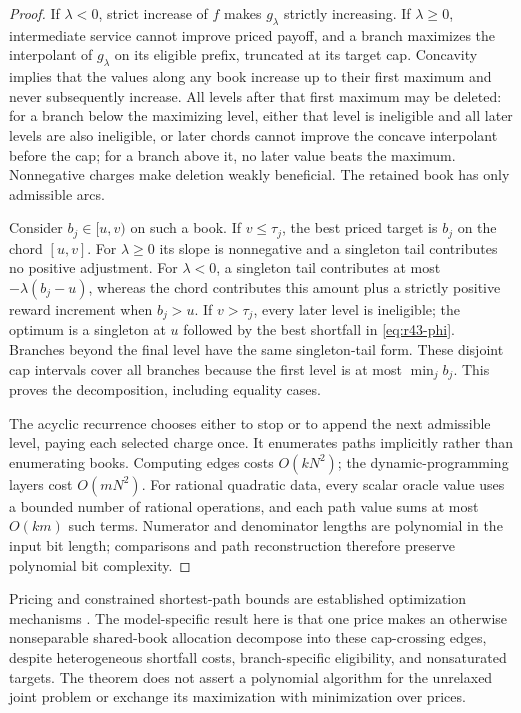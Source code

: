 \begin{proof}
If $\lambda<0$, strict increase of $f$ makes $g_\lambda$ strictly increasing. If $\lambda\geq0$, intermediate service cannot improve priced payoff, and a branch maximizes the interpolant of $g_\lambda$ on its eligible prefix, truncated at its target cap. Concavity implies that the values along any book increase up to their first maximum and never subsequently increase. All levels after that first maximum may be deleted: for a branch below the maximizing level, either that level is ineligible and all later levels are also ineligible, or later chords cannot improve the concave interpolant before the cap; for a branch above it, no later value beats the maximum. Nonnegative charges make deletion weakly beneficial. The retained book has only admissible arcs.

Consider $b_j\in[u,v)$ on such a book. If $v\leq\tau_j$, the best priced target is $b_j$ on the chord $[u,v]$. For $\lambda\geq0$ its slope is nonnegative and a singleton tail contributes no positive adjustment. For $\lambda<0$, a singleton tail contributes at most $-\lambda(b_j-u)$, whereas the chord contributes this amount plus a strictly positive reward increment when $b_j>u$. If $v>\tau_j$, every later level is ineligible; the optimum is a singleton at $u$ followed by the best shortfall in \eqref{eq:r43-phi}. Branches beyond the final level have the same singleton-tail form. These disjoint cap intervals cover all branches because the first level is at most $\min_j b_j$. This proves the decomposition, including equality cases.

The acyclic recurrence chooses either to stop or to append the next admissible level, paying each selected charge once. It enumerates paths implicitly rather than enumerating books. Computing edges costs $O(kN^2)$; the dynamic-programming layers cost $O(mN^2)$. For rational quadratic data, every scalar oracle value uses a bounded number of rational operations, and each path value sums at most $O(km)$ such terms. Numerator and denominator lengths are polynomial in the input bit length; comparisons and path reconstruction therefore preserve polynomial bit complexity.
\end{proof}

Pricing and constrained shortest-path bounds are established optimization mechanisms \citep{HandlerZang1980}. The model-specific result here is that one price makes an otherwise nonseparable shared-book allocation decompose into these cap-crossing edges, despite heterogeneous shortfall costs, branch-specific eligibility, and nonsaturated targets. The theorem does not assert a polynomial algorithm for the unrelaxed joint problem or exchange its maximization with minimization over prices.

